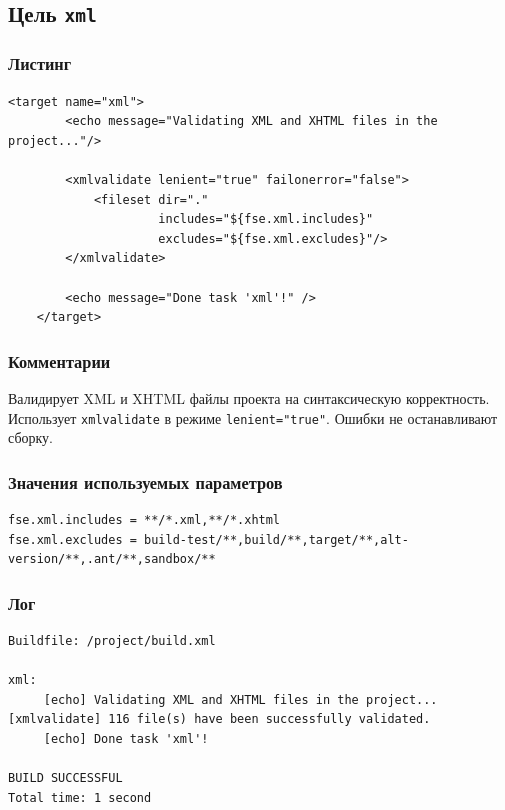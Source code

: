 \subsection{Цель \texttt{xml}}

\subsubsection{Листинг}

\begin{lstlisting}[caption={Часть содержимого файла \texttt{build.xml}},captionpos=b]
    <target name="xml">
        <echo message="Validating XML and XHTML files in the project..."/>

        <xmlvalidate lenient="true" failonerror="false">
            <fileset dir="."
                     includes="${fse.xml.includes}"
                     excludes="${fse.xml.excludes}"/>
        </xmlvalidate>

        <echo message="Done task 'xml'!" />
    </target>
\end{lstlisting}

\subsubsection{Комментарии}

Валидирует XML и XHTML файлы проекта на синтаксическую корректность. Использует \texttt{xmlvalidate} в режиме \texttt{lenient="true"}. Ошибки не останавливают сборку.

\subsubsection{Значения используемых параметров}

\begin{lstlisting}[language=Properties,caption={Часть содержимого файла \texttt{build.properties}},captionpos=b]
fse.xml.includes = **/*.xml,**/*.xhtml
fse.xml.excludes = build-test/**,build/**,target/**,alt-version/**,.ant/**,sandbox/**
\end{lstlisting}

\subsubsection{Лог}

\begin{lstlisting}[caption={Лог цели \texttt{xml}},language={},captionpos=b]
Buildfile: /project/build.xml

xml:
     [echo] Validating XML and XHTML files in the project...
[xmlvalidate] 116 file(s) have been successfully validated.
     [echo] Done task 'xml'!

BUILD SUCCESSFUL
Total time: 1 second
\end{lstlisting}